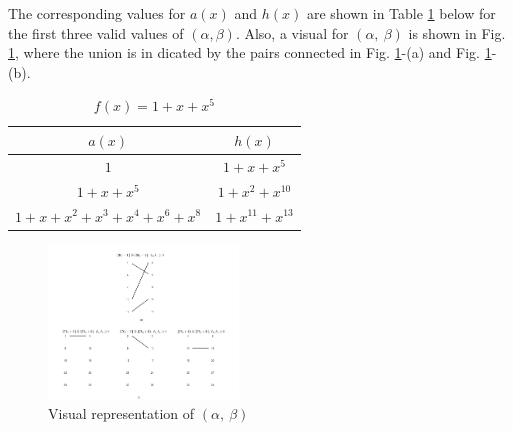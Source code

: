 \begin{example}
The corresponding values for $a(x)$ and $h(x)$ are shown in Table \ref{novelTab8-b} below for the first three valid values of $(\alpha,\beta)$.
Also, a visual for $(\alpha,~\beta)$ is shown in Fig. \ref{fig:example5-union}, where the union is in dicated by the pairs connected in  Fig. \ref{fig:example5-union}-(a) and  Fig. \ref{fig:example5-union}-(b).
\begin{table}[htbp]
 \caption{$f(x)=1+x+x^5$}
\centering
 \begin{tabular}{c c} 
 \hline
 $a(x)$ & $h(x)$\\ [0.5ex] 
 \hline\hline
$1$ & $1+x+x^{5}$\\ 
\hline
$1+x+x^5$ &  $1+x^2+x^{10}$\\
\hline
$1+x+x^2+x^3+x^4+x^{6}+x^{8}$ & $1+x^{11}+x^{13}$\\
 \end{tabular}
 \label{novelTab8-b}
\end{table}

\begin{figure}[h]
\centering
		\includegraphics[width=0.45\textwidth]{./ConfSources/pair_union.png}
		\caption{Visual representation of $(\alpha,~\beta)$ }
		\label{fig:example5-union}
		\end{figure}
\end{example}
 







